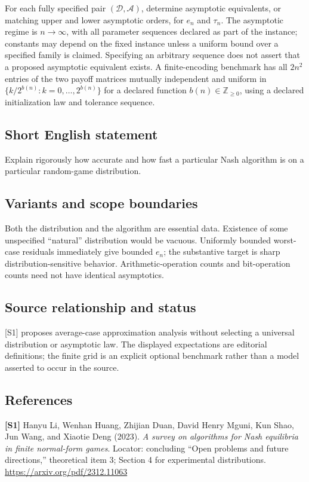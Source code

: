 \documentclass[11pt,a4paper]{article}
\begin{document}
For each fully specified pair $(\mathcal D,\mathcal A)$, determine asymptotic equivalents, or matching upper and lower asymptotic orders, for $e_n$ and $\tau_n$. The asymptotic regime is $n\to\infty$, with all parameter sequences declared as part of the instance; constants may depend on the fixed instance unless a uniform bound over a specified family is claimed. Specifying an arbitrary sequence does not assert that a proposed asymptotic equivalent exists. A finite-encoding benchmark has all $2n^2$ entries of the two payoff matrices mutually independent and uniform in $\{k/2^{b(n)}:k=0,\ldots,2^{b(n)}\}$ for a declared function $b(n)\in\mathbb Z_{\geq0}$, using a declared initialization law and tolerance sequence.
\subsection*{Short English statement}
Explain rigorously how accurate and how fast a particular Nash algorithm is on a particular random-game distribution.
\subsection*{Variants and scope boundaries}
Both the distribution and the algorithm are essential data. Existence of some unspecified ``natural'' distribution would be vacuous. Uniformly bounded worst-case residuals immediately give bounded $e_n$; the substantive target is sharp distribution-sensitive behavior. Arithmetic-operation counts and bit-operation counts need not have identical asymptotics.
\subsection*{Source relationship and status}
[S1] proposes average-case approximation analysis without selecting a universal distribution or asymptotic law. The displayed expectations are editorial definitions; the finite grid is an explicit optional benchmark rather than a model asserted to occur in the source.
\subsection*{References}
\begingroup\footnotesize\raggedright
{\footnotesize\raggedright
\textbf{[S1]} Hanyu Li, Wenhan Huang, Zhijian Duan, David Henry Mguni, Kun Shao, Jun Wang, and Xiaotie Deng (2023). \emph{A survey on algorithms for Nash equilibria in finite normal-form games}. Locator: concluding ``Open problems and future directions,'' theoretical item 3; Section 4 for experimental distributions. \url{https://arxiv.org/pdf/2312.11063}\par}
\par\endgroup
\end{document}
